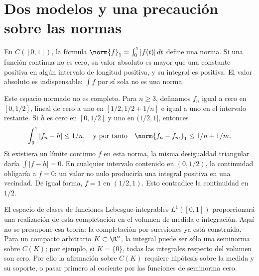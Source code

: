 \section{Dos modelos y una precaución sobre las normas}
\begin{ejemplo}
En $C([0,1])$, la fórmula $\norm{f}_1=\int_0^1|f(t)|\,dt$ define una norma. Si una función continua no es cero, su valor absoluto es mayor que una constante positiva en algún intervalo de longitud positiva, y su integral es positiva. El valor absoluto es indispensable: $\int f$ por sí sola no es una norma.

Este espacio normado no es completo. Para $n\geq3$, definamos $f_n$ igual a cero en $[0,1/2]$, lineal de cero a uno en $[1/2,1/2+1/n]$ e igual a uno en el intervalo restante. Si $h$ es cero en $[0,1/2]$ y uno en $(1/2,1]$, entonces
\[
 \int_0^1|f_n-h|\leq1/n,
 \quad\text{y por tanto}\quad
 \norm{f_n-f_m}_1\leq1/n+1/m.
\]
Si existiera un límite continuo $f$ en esta norma, la misma desigualdad triangular daría $\int|f-h|=0$. En cualquier intervalo contenido en $(0,1/2)$, la continuidad obligaría a $f=0$: un valor no nulo produciría una integral positiva en una vecindad. De igual forma, $f=1$ en $(1/2,1)$. Esto contradice la continuidad en $1/2$.

El espacio de clases de funciones Lebesgue-integrables $L^1([0,1])$ proporcionará una realización de esta completación en el volumen de medida e integración. Aquí no se presupone esa teoría: la completación por sucesiones ya está construida. Para un compacto arbitrario $K\subset\R^n$, la integral puede ser sólo una seminorma sobre $C(K)$; por ejemplo, si $K=\{0\}$, todas las integrales respecto del volumen son cero. Por ello la afirmación sobre $C(K)$ requiere hipótesis sobre la medida y su soporte, o pasar primero al cociente por las funciones de seminorma cero.
\end{ejemplo}


